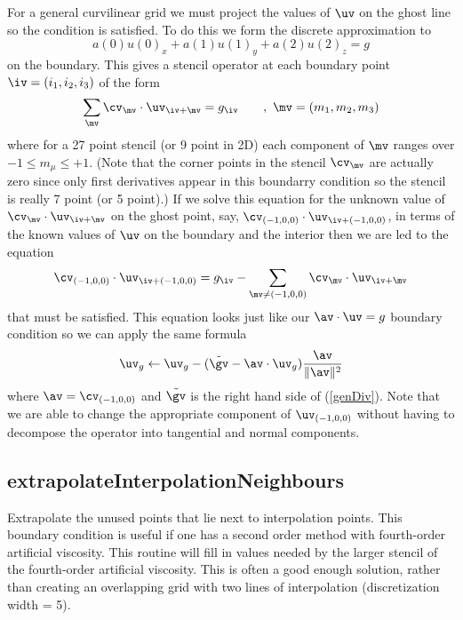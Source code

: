 For a general curvilinear grid we must project the values of $\uv$ on the ghost line so the condition is satisfied. 
To do this we form the discrete approximation to 
\[ 
     a(0) u(0)_x + a(1) u(1)_y + a(2) u(2)_z = g
\]
on the boundary. This gives a stencil operator at each boundary point $\iv=(i_1,i_2,i_3)$ 
of the form
\[
      \sum_{\mv}  \cv_\mv \cdot \uv_{\iv+\mv} = g_{\iv} \qquad,~ \mv=(m_1,m_2,m_3)
\]
where for a 27 point stencil (or 9 point in 2D) each component of $\mv$ ranges over $-1\le m_\mu \le +1$. (Note that
the corner points in the stencil $\cv_\mv$ are actually zero since only first derivatives appear
in this boundarry condition so the stencil is really 7 point (or 5 point).)
If we solve this equation for the unknown value of $\cv_\mv \cdot \uv_{\iv+\mv}$ 
on the ghost point, say, $\cv_{(-1,0,0)} \cdot \uv_{\iv+(-1,0,0)}$,
in terms of the known values of $\uv$ on the boundary and the interior then we are led to 
the equation
\begin{equation}
\cv_{(-1,0,0)} \cdot \uv_{\iv+(-1,0,0)} 
    = g_{\iv} - \sum_{\mv\ne(-1,0,0)}  \cv_\mv \cdot \uv_{\iv+\mv}  \label{genDiv}
\end{equation}
that must be satisfied. This equation looks just like our $\av\cdot\uv=g$ boundary condition so we
can apply the same formula
\[ 
 \uv_g \leftarrow \uv_g - (\tilde{\gv} - \av \cdot \uv_g ) {\av \over \| \av \|^2  } 
\]
where $\av=\cv_{(-1,0,0)}$ and $\tilde{\gv}$ is the right hand side of (\ref{genDiv}).
Note that we are able to change the appropriate component of $\uv_{(-1,0,0)}$ without
having to decompose the operator into tangential and normal components.

% 

% 
% 

\subsection{extrapolateInterpolationNeighbours}
 Extrapolate the unused points that lie next to interpolation points. This
boundary condition is useful if one has a second order method with
fourth-order artificial viscosity. This routine will fill in values
needed by the larger stencil of the fourth-order artificial viscosity. This
is often a good enough solution, rather than creating an overlapping grid
with two lines of interpolation (discretization width = 5).


